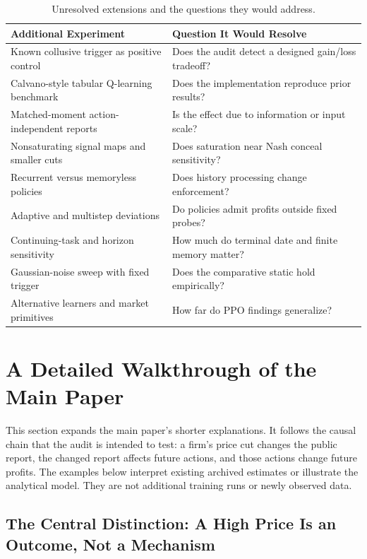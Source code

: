\documentclass{article}
\begin{document}
\begin{table}[t]
\centering
\caption{Unresolved extensions and the questions they would address.}
\label{tab:extensions}
\small
\begin{tabular}{@{}ll@{}}
\toprule
Additional Experiment & Question It Would Resolve \\
\midrule
Known collusive trigger as positive control & Does the audit detect a designed gain/loss tradeoff? \\
Calvano-style tabular Q-learning benchmark & Does the implementation reproduce prior results? \\
Matched-moment action-independent reports & Is the effect due to information or input scale? \\
Nonsaturating signal maps and smaller cuts & Does saturation near Nash conceal sensitivity? \\
Recurrent versus memoryless policies & Does history processing change enforcement? \\
Adaptive and multistep deviations & Do policies admit profits outside fixed probes? \\
Continuing-task and horizon sensitivity & How much do terminal date and finite memory matter? \\
Gaussian-noise sweep with fixed trigger & Does the comparative static hold empirically? \\
Alternative learners and market primitives & How far do PPO findings generalize? \\
\bottomrule
\end{tabular}
\end{table}

\section{A Detailed Walkthrough of the Main Paper}\label{app:walkthrough}

This section expands the main paper's shorter explanations. It follows the causal chain that the audit is intended to test: a firm's price cut changes the public report, the changed report affects future actions, and those actions change future profits. The examples below interpret existing archived estimates or illustrate the analytical model. They are not additional training runs or newly observed data.

\subsection{The Central Distinction: A High Price Is an Outcome, Not a Mechanism}
\end{document}
